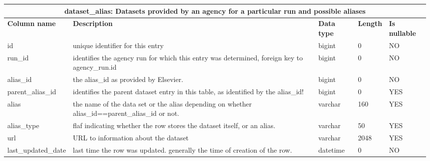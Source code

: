\documentclass[titlepage, 11pt]{article}
\begin{document}
{\begin{table}[h!]
{\begin{tabularx}{1\textwidth} {|p{4cm}|p{5.33cm}|p{2cm}|p{1.5cm}|p{1.5cm}|}
\end{tabularx}
\label{table: appendix b - author affiliation}
}
\end{table}

\begin{table}[h!]

{\renewcommand{\arraystretch}{1.5}%
\begin{tabularx}{1\textwidth} {|p{4cm}|p{5.33cm}|p{2cm}|p{1.5cm}|p{1.5cm}|}
 \hline
 \multicolumn{5}{|c|}{\textbf{dataset\_alias: Datasets provided by an agency  for a particular run and possible aliases}}\\
 \hline
 \textbf{Column name} & \textbf{Description} & \textbf{Data type} & \textbf{Length} & \textbf{Is nullable} \\
 \hline
 id & unique identifier for this entry  & bigint  & 0   & NO  \\
 \hline
 run\_id  & identifies the agency run for which this entry was determined, foreign key to agency\_run.id   & bigint   & 0   & NO  \\
 \hline
 alias\_id & the alias\_id as provided by Elsevier. & bigint  & 0   & NO  \\
 \hline
 parent\_alias\_id  & identifies the parent dataset entry in this table, as identified by the alias\_id!  & bigint   & 0   & YES \\
 \hline
 alias & the name of the data set or the alias depending on whether alias\_id==parent\_alias\_id or not. & varchar  & 160 & YES \\
 \hline
 alias\_type & flaf indicating whether the row stores the dataset itself, or an alias. & varchar  & 50  & YES \\
 \hline
 url  & URL to information about the dataset   & varchar & 2048 & YES \\
 \hline
 last\_updated\_date & last time the row was updated. generally the time of creation of the row. & datetime & 0   & NO \\
\hline

\end{tabularx}
\label{table: appendix b - dataset alias}
}
\end{table}

\begin{table}[h!]


\end{table}}
\end{document}
